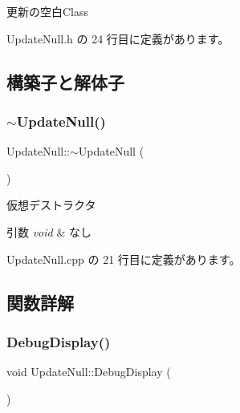 更新の空白\+Class 

 Update\+Null.\+h の 24 行目に定義があります。



\subsection{構築子と解体子}
\mbox{\label{class_update_null_a917cb158fb0993b736c59ed8300e7a77}} 
\subsubsection{\texorpdfstring{$\sim$\+Update\+Null()}{~UpdateNull()}}
{\footnotesize\ttfamily Update\+Null\+::$\sim$\+Update\+Null (\begin{DoxyParamCaption}{ }\end{DoxyParamCaption})\hspace{0.3cm}{\ttfamily [virtual]}}



仮想デストラクタ 


\begin{DoxyParams}{引数}
{\em void} & なし \\
\hline
\end{DoxyParams}


 Update\+Null.\+cpp の 21 行目に定義があります。



\subsection{関数詳解}
\mbox{\label{class_update_null_a98c7241e5ef276510830eb6df9ed0fbb}} 
\subsubsection{\texorpdfstring{Debug\+Display()}{DebugDisplay()}}
{\footnotesize\ttfamily void Update\+Null\+::\+Debug\+Display (\begin{DoxyParamCaption}{ }\end{DoxyParamCaption})\hspace{0.3cm}{\ttfamily [virtual]}}




